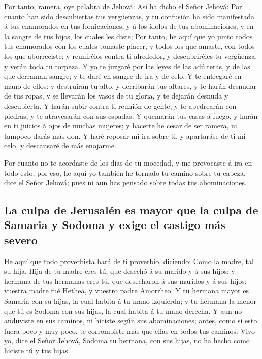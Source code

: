  Por tanto, ramera, oye palabra de Jehová:
 Así ha dicho el Señor Jehová: Por cuanto han sido
descubiertas tus vergüenzas, y tu confusión ha sido manifestada á tus
enamorados en tus fornicaciones, y á los ídolos de tus abominaciones, y
en la sangre de tus hijos, los cuales les diste;  Por
tanto, he aquí que yo junto todos tus enamorados con los cuales tomaste
placer, y todos los que amaste, con todos los que aborreciste; y
reunirélos contra ti alrededor, y descubriréles tu vergüenza, y verán
toda tu torpeza.  Y yo te juzgaré por las leyes de las
adúlteras, y de las que derraman sangre; y te daré en sangre de ira y de
celo.  Y te entregaré en mano de ellos: y destruirán tu
alto, y derribarán tus altares, y te harán desnudar de tus ropas, y se
llevarán los vasos de tu gloria, y te dejarán desnuda y descubierta.
 Y harán subir contra ti reunión de gente, y te
apedrearán con piedras, y te atravesarán con sus espadas.
 Y quemarán tus casas á fuego, y harán en ti juicios á
ojos de muchas mujeres; y hacerte he cesar de ser ramera, ni tampoco
darás más don.  Y haré reposar mi ira sobre ti, y
apartaráse de ti mi celo, y descansaré de más enojarme.

 Por cuanto no te acordaste de los días de tu mocedad, y
me provocaste á ira en todo esto, por eso, he aquí yo también he tornado
tu camino sobre tu cabeza, dice el Señor Jehová; pues ni aun has pensado
sobre todas tus abominaciones.

\hypertarget{la-culpa-de-jerusaluxe9n-es-mayor-que-la-culpa-de-samaria-y-sodoma-y-exige-el-castigo-muxe1s-severo}{%
\subsection{La culpa de Jerusalén es mayor que la culpa de Samaria y
Sodoma y exige el castigo más
severo}\label{la-culpa-de-jerusaluxe9n-es-mayor-que-la-culpa-de-samaria-y-sodoma-y-exige-el-castigo-muxe1s-severo}}

 He aquí que todo proverbista hará de ti proverbio,
diciendo: Como la madre, tal su hija.  Hija de tu madre
eres tú, que desechó á su marido y á sus hijos; y hermana de tus
hermanas eres tú, que desecharon á sus maridos y á sus hijos: vuestra
madre fué Hethea, y vuestro padre Amorrheo.  Y tu hermana
mayor es Samaria con su hijas, la cual habita á tu mano izquierda; y tu
hermana la menor que tú es Sodoma con sus hijas, la cual habita á tu
mano derecha.  Y aun no anduviste en sus caminos, ni
hiciste según sus abominaciones; antes, como si esto fuera poco y muy
poco, te corrompiste más que ellas en todos tus caminos. 
Vivo yo, dice el Señor Jehová, Sodoma tu hermana, con sus hijas, no ha
hecho como hiciste tú y tus hijas.

